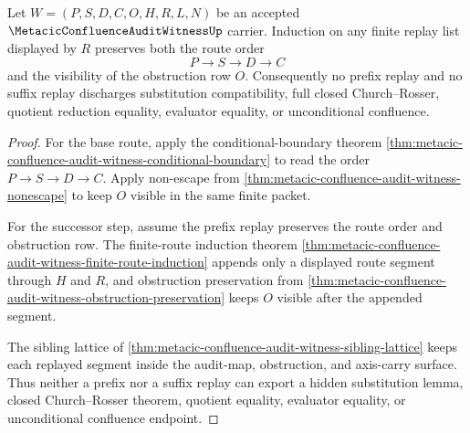 \begin{theorem}
\label{thm:metacic-confluence-audit-witness-obstruction-induction}
Let $W=(P,S,D,C,O,H,R,L,N)$ be an accepted $\MetacicConfluenceAuditWitnessUp$ carrier. Induction on any finite replay list displayed by $R$ preserves both the route order
$$
P \longrightarrow S \longrightarrow D \longrightarrow C
$$
and the visibility of the obstruction row $O$. Consequently no prefix replay and no suffix replay discharges substitution compatibility, full closed Church--Rosser, quotient reduction equality, evaluator equality, or unconditional confluence.
\end{theorem}
\begin{proof}
For the base route, apply the conditional-boundary theorem \autoref{thm:metacic-confluence-audit-witness-conditional-boundary} to read the order $P \to S \to D \to C$. Apply non-escape from \autoref{thm:metacic-confluence-audit-witness-nonescape} to keep $O$ visible in the same finite packet.

For the successor step, assume the prefix replay preserves the route order and obstruction row. The finite-route induction theorem \autoref{thm:metacic-confluence-audit-witness-finite-route-induction} appends only a displayed route segment through $H$ and $R$, and obstruction preservation from \autoref{thm:metacic-confluence-audit-witness-obstruction-preservation} keeps $O$ visible after the appended segment.

The sibling lattice of \autoref{thm:metacic-confluence-audit-witness-sibling-lattice} keeps each replayed segment inside the audit-map, obstruction, and axis-carry surface. Thus neither a prefix nor a suffix replay can export a hidden substitution lemma, closed Church--Rosser theorem, quotient equality, evaluator equality, or unconditional confluence endpoint.
\end{proof}

